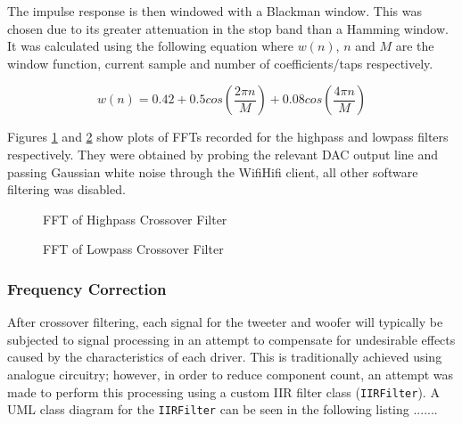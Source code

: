 \documentclass[main.tex]{subfiles}
\begin{document}
\medskip
The impulse response is then windowed with a Blackman window.
This was chosen due to its greater attenuation in the stop band than a Hamming window\cite{DSP-berndporr}.
It was calculated using the following equation where $w(n)$, $n$ and $M$ are the window function, current sample and number of coefficients/taps respectively.

\begin{equation}
    w(n)=
    0.42 + 0.5cos\left(\frac{2\pi n}{M}\right) + 0.08cos\left(\frac{4\pi n}{M}\right)
\end{equation}

Figures \ref{fig:tweeter-fft} and \ref{fig:woofer-fft} show plots of FFTs recorded for the highpass and lowpass filters respectively.
They were obtained by probing the relevant DAC output line and passing Gaussian white noise through the WifiHifi client, all other software filtering was disabled.

\begin{figure}[H]
    \centering
    \caption{FFT of Highpass Crossover Filter}
    \label{fig:tweeter-fft}
\end{figure}

\begin{figure}[H]
    \centering
    \caption{FFT of Lowpass Crossover Filter}
    \label{fig:woofer-fft}
\end{figure}

\subsubsection{Frequency Correction}
After crossover filtering, each signal for the tweeter and woofer will typically be subjected to signal processing in an attempt to compensate for undesirable effects caused by the characteristics of each driver.
This is traditionally achieved using analogue circuitry; however, in order to reduce component count, an attempt was made to perform this processing using a custom IIR filter class (\lstinline{IIRFilter}).
A UML class diagram for the \lstinline{IIRFilter} can be seen in the following listing .......
\end{document}
